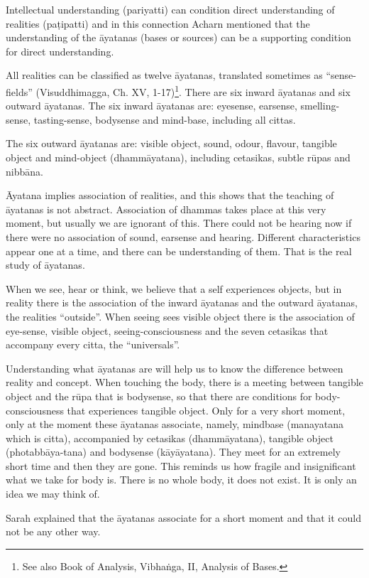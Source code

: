 Intellectual understanding (pariyatti) can condition direct
understanding of realities (paṭipatti) and in this connection Acharn
mentioned that the understanding of the āyatanas (bases or sources) can
be a supporting condition for direct understanding.

All realities can be classified as twelve āyatanas, translated sometimes
as ``sense-fields'' (Visuddhimagga, Ch. XV,
1-17)\footnote{See also Book of
Analysis, Vibhaṅga, II, Analysis of Bases.}. There are six
inward āyatanas and six outward āyatanas. The six inward āyatanas are:
eyesense, earsense, smelling-sense, tasting-sense, bodysense and
mind-base, including all cittas.

The six outward āyatanas are: visible object, sound, odour, flavour,
tangible object and mind-object (dhammāyatana), including cetasikas,
subtle rūpas and nibbāna.

Āyatana implies association of realities, and this shows that the
teaching of āyatanas is not abstract. Association of dhammas takes place
at this very moment, but usually we are ignorant of this. There could
not be hearing now if there were no association of sound, earsense and
hearing. Different characteristics appear one at a time, and there can
be understanding of them. That is the real study of āyatanas.

When we see, hear or think, we believe that a self experiences objects,
but in reality there is the association of the inward āyatanas and the
outward āyatanas, the realities ``outside''. When seeing sees visible
object there is the association of eye-sense, visible object,
seeing-consciousness and the seven cetasikas that accompany every citta,
the ``universals''.

Understanding what āyatanas are will help us to know the difference
between reality and concept. When touching the body, there is a meeting
between tangible object and the rūpa that is bodysense, so that there
are conditions for body-consciousness that experiences tangible object.
Only for a very short moment, only at the moment these āyatanas
associate, namely, mindbase (manayatana which is citta), accompanied by
cetasikas (dhammāyatana), tangible object (photabbāya-tana) and
bodysense (kāyāyatana). They meet for an extremely short time and then
they are gone. This reminds us how fragile and insignificant what we
take for body is. There is no whole body, it does not exist. It is only
an idea we may think of.

Sarah explained that the āyatanas associate for a short moment and that
it could not be any other way.

